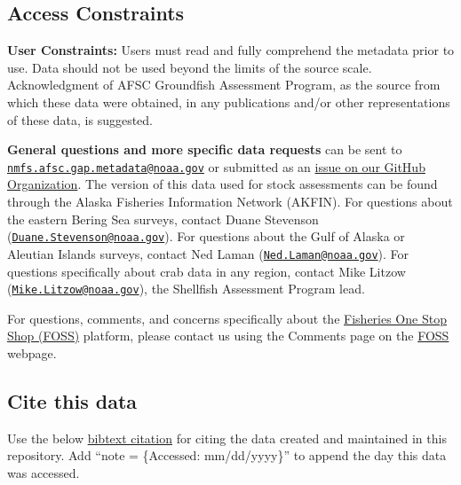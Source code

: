 \documentclass[
  letterpaper,
  oneside,
  open=any]{scrbook}
\begin{document}
\subsection*{Access Constraints}\label{access-constraints-1}

\textbf{User Constraints:} Users must read and fully comprehend the
metadata prior to use. Data should not be used beyond the limits of the
source scale. Acknowledgment of AFSC Groundfish Assessment Program, as
the source from which these data were obtained, in any publications
and/or other representations of these data, is suggested.

\textbf{General questions and more specific data requests} can be sent
to
\href{mailto:nmfs.afsc.gap.metadata@noaa.gov}{\nolinkurl{nmfs.afsc.gap.metadata@noaa.gov}}
or submitted as an
\href{https://github.com/afsc-gap-products/data-requests}{issue on our
GitHub Organization}. The version of this data used for stock
assessments can be found through the Alaska Fisheries Information
Network (AKFIN). For questions about the eastern Bering Sea surveys,
contact Duane Stevenson
(\href{mailto:Duane.Stevenson@noaa.gov}{\nolinkurl{Duane.Stevenson@noaa.gov}}).
For questions about the Gulf of Alaska or Aleutian Islands surveys,
contact Ned Laman
(\href{mailto:Ned.Laman@noaa.gov}{\nolinkurl{Ned.Laman@noaa.gov}}). For
questions specifically about crab data in any region, contact Mike
Litzow
(\href{mailto:Mike.Litzow@noaa.gov}{\nolinkurl{Mike.Litzow@noaa.gov}}),
the Shellfish Assessment Program lead.

For questions, comments, and concerns specifically about the
\href{https://www.fisheries.noaa.gov/foss}{Fisheries One Stop Shop
(FOSS)} platform, please contact us using the Comments page on the
\href{https://www.fisheries.noaa.gov/foss}{FOSS} webpage.

\subsection*{Cite this data}\label{cite-this-data-3}

Use the below
\href{https://github.com/afsc-gap-products/gap_products/blob/main/content/references.bib}{bibtext
citation} for citing the data created and maintained in this repository.
Add ``note = \{Accessed: mm/dd/yyyy\}'' to append the day this data was
accessed.
\end{document}
